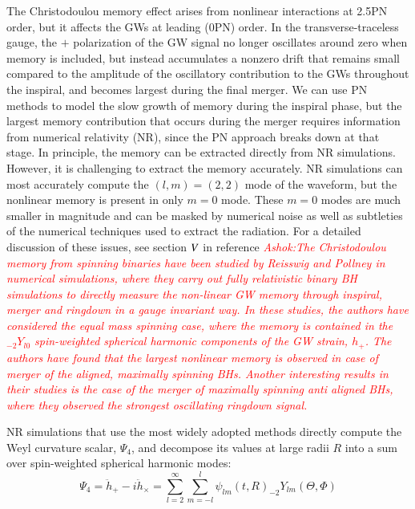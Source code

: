 \documentclass[twocolumn,showpacs,aps,prd,nobibnotes,floatfix]{revtex4-1}
\newcommand{\RomanNumeralCaps}[1]{\MakeUppercase{\romannumeral #1}}
\newcommand{\ashok}[1]{\textcolor{red}{\textit{Ashok:#1}}}
\begin{document}
\par The Christodoulou memory effect arises from nonlinear interactions at 2.5PN order, but it affects the GWs at leading (0PN) order. In the transverse-traceless gauge, the $+$ polarization of the GW signal no longer oscillates around zero when memory is included, but instead accumulates a nonzero drift that remains small compared to the amplitude of the oscillatory contribution to the GWs throughout the inspiral, and becomes largest during the final merger.  We can use PN methods to model the slow growth of memory during the inspiral phase, but the largest memory contribution that occurs during the merger requires information from numerical relativity (NR), since the PN approach breaks down at that stage. In principle, the memory can be extracted directly from NR simulations. However, it is challenging to extract the memory accurately. NR simulations can most accurately compute the $(l, m) = (2, 2)$ mode of the waveform, but the nonlinear memory is present in only $m=0$ mode. These $m=0$ modes are much smaller in magnitude and can be masked by numerical noise as well as subtleties of the numerical techniques used to extract the radiation. For a detailed discussion of these issues, see section $\RomanNumeralCaps{5}$ in reference \cite{Favata2009} \ashok{The Christodoulou memory from spinning binaries have been studied by Reisswig and Pollney \cite{Reisswig2011} in numerical simulations, where they carry out fully relativistic binary BH simulations to directly measure the non-linear GW memory through inspiral, merger and ringdown in a gauge invariant way. In these studies, the authors have considered the equal mass spinning case, where the memory is contained in the $_{-2}Y_{l0}$ spin-weighted spherical harmonic components of the GW strain, $h_{+}$. The authors have found that the largest nonlinear memory is observed in case of merger of the aligned, maximally spinning BHs. Another interesting results in their studies is the case of the merger of maximally spinning anti aligned BHs, where they observed the strongest oscillating ringdown signal.} 
\par NR simulations that use the most widely adopted methods directly compute the Weyl curvature scalar, $\Psi_4$, and decompose its values at large radii $R$ into a sum over spin-weighted spherical harmonic modes:
\begin{equation}
	\Psi_4 = \ddot{h}_+ - \mathit{i}\ddot{h}_\times = \sum_{l=2}^{\infty}\sum_{m=-l}^{l}\psi_{lm}(t, R) _{-2}Y_{lm}(\Theta, \Phi)
\end{equation} 
\end{document}
